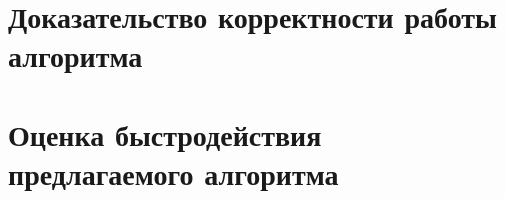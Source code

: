 \section{Доказательство корректности работы алгоритма} \label{subsect2_3}

\section{Оценка быстродействия предлагаемого алгоритма} \label{subsect2_4}


